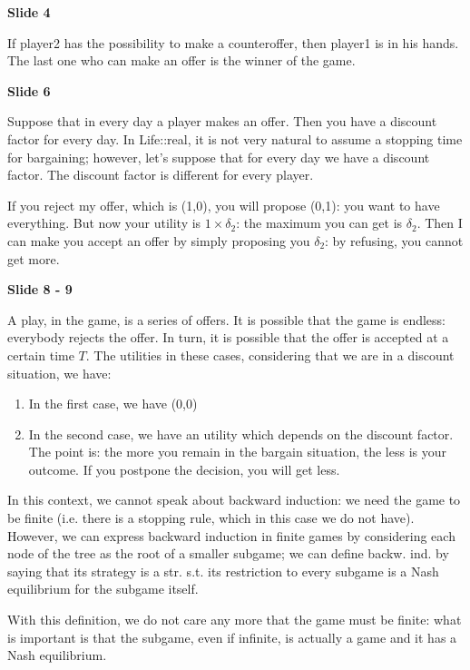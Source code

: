 \documentclass[pt11,a4paper,twoside,reqno,openright]{paper}
\begin{document}

\bigskip
\noindent \textbf{Slide 4}

\noindent If player2 has the possibility to make a counteroffer, then player1 
is in his hands. The last one who can make an offer is the winner of the game.

\bigskip
\noindent \textbf{Slide 6}

\noindent Suppose that in every day a player makes an offer. Then you have a 
discount factor for every day. In Life::real, it is not very natural to 
assume a stopping time for bargaining; however, let's suppose that for every 
day we have a discount factor. The discount factor is different for 
every player. 

\noindent If you reject my offer, which is (1,0), you will propose (0,1): you 
want to have everything. But now your utility is $1 \times \delta_2$: the 
maximum you can get is $\delta_2$. Then I can make you accept an offer by 
simply proposing you $\delta_2$: by refusing, you cannot get more. 

\bigskip
\noindent \textbf{Slide 8 - 9}

\noindent A play, in the game, is a series of offers. It is possible that the 
game is endless: everybody rejects the offer. In turn, it is possible that the 
offer is accepted at a certain time $T$. The utilities in these cases, 
considering that we are in a discount situation, we have:
\begin{enumerate}
	\item In the first case, we have (0,0)
	\item In the second case, we have an utility which depends on the discount 
	factor. The point is: the more you remain in the bargain situation, the 
	less is your outcome. If you postpone the decision, you will get less.
\end{enumerate}

\noindent In this context, we cannot speak about backward induction: we need 
the game to be finite (i.e. there is a stopping rule, which in this case we 
do not have). However, we can express backward induction in finite games by 
considering each node of the tree as the root of a smaller subgame; we can 
define backw. ind. by saying that its strategy is a str. s.t. its restriction 
to every subgame is a Nash equilibrium for the subgame itself.

\noindent With this definition, we do not care any more that the game must be 
finite: what is important is that the subgame, even if infinite, is actually 
a game and it has a Nash equilibrium.
\end{document}
